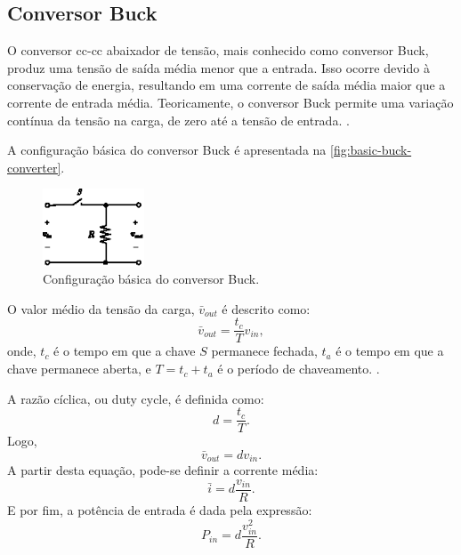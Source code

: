 \subsection{Conversor Buck}

O conversor \acrshort{cc}-\acrshort{cc} abaixador de tensão, mais conhecido como conversor Buck, produz uma tensão de saída média menor que a entrada. Isso ocorre devido à conservação de energia, resultando em uma corrente de saída média maior que a corrente de entrada média. Teoricamente, o conversor Buck permite uma variação contínua da tensão na carga, de zero até a tensão de entrada. \cite{martins2008}.

A configuração básica do conversor Buck é apresentada na \autoref{fig:basic-buck-converter}.

\begin{figure}[H]
  \centering
  \includegraphics[width=0.27\textwidth]{figuras/basic_buck_conversor.eps}
  \caption{Configuração básica do conversor Buck.}
  \label{fig:basic-buck-converter}
\end{figure}

O valor médio da tensão da carga, $\bar{v}_{out}$ é descrito como: \begin{equation} \bar{v}_{out} = \frac{t_c}{T}v_{in}, \end{equation} onde, $t_c$ é o tempo em que a chave $S$ permanece fechada, $t_a$ é o tempo em que a chave permanece aberta, e $T = t_c + t_a$ é o período de chaveamento. \cite{martins2008}.

A razão cíclica, ou duty cycle, é definida como: \begin{equation} d = \frac{t_c}{T}. \end{equation} Logo, \begin{equation} \bar{v}_{out} = dv_{in}. \label{eq:buck-1}\end{equation} A partir desta equação, pode-se definir a corrente média: \begin{equation} \bar{i} = d\frac{v_{in}}{R}. \end{equation} E por fim, a potência de entrada é dada pela expressão: \begin{equation} P_{in} = d \frac{v_{in}^2}{R}. \end{equation}

